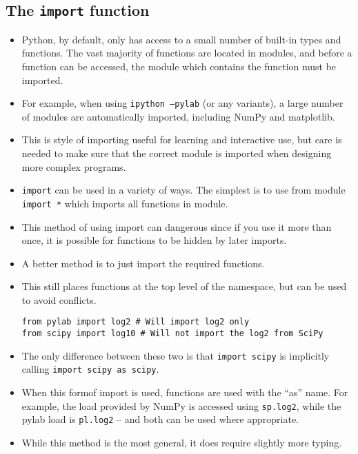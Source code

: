 \documentclass[KSmain.tex]{subfiles}
\begin{document}
\subsection{The \texttt{import} function}
\begin{itemize}
\item Python, by default, only has access to a small number of built-in types and functions. The vast majority of
functions are located in modules, and before a function can be accessed, the module which contains the
function must be imported. 

\item For example, when using \texttt{ipython --pylab} (or any variants), a large number
of modules are automatically imported, including NumPy and matplotlib.
\item This is style of importing useful
for learning and interactive use, but care is needed to make sure that the correct module is imported when
designing more complex programs.

\item \texttt{import} can be used in a variety of ways. The simplest is to use from module \texttt{import *} which imports
all functions in module. 
\item This method of using import can dangerous since if you use it more than once,
it is possible for functions to be hidden by later imports. 
\item A better method is to just import the required
functions. 
\item This still places functions at the top level of the namespace, but can be used to avoid conflicts.
\begin{framed}
\begin{verbatim}
from pylab import log2 # Will import log2 only
from scipy import log10 # Will not import the log2 from SciPy
\end{verbatim}
\end{framed}
\item The only difference between these two is that \texttt{import scipy} is implicitly calling \texttt{import scipy as scipy}.
\item When this formof import is used, functions are used with the “as” name. For example, the load provided
by NumPy is accessed using \texttt{sp.log2}, while the pylab load is \texttt{pl.log2} – and both can be used where appropriate.
\item While this method is the most general, it does require slightly more typing.
\end{itemize}
\end{document}
